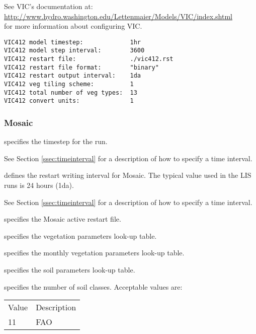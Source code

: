 
 See VIC's documentation at: \\
 \hyperref{http://www.hydro.washington.edu/Lettenmaier/Models/VIC/index.shtml}{}{}{http://www.hydro.washington.edu/Lettenmaier/Models/VIC/index.shtml} \\
 for more information about configuring VIC.
 

 \begin{Verbatim}[frame=single]
VIC412 model timestep:             1hr
VIC412 model step interval:        3600
VIC412 restart file:               ./vic412.rst
VIC412 restart file format:        "binary"
VIC412 restart output interval:    1da
VIC412 veg tiling scheme:          1
VIC412 total number of veg types:  13
VIC412 convert units:              1
 \end{Verbatim}




 
 \subsubsection{Mosaic} \label{sssec:lsm_mosaic}
 

 
  specifies the timestep for the run.

 See Section \ref{ssec:timeinterval} for a description
 of how to specify a time interval.

  defines the restart
 writing interval for Mosaic.  The typical value used in the
 LIS runs is 24 hours (1da).

 See Section \ref{ssec:timeinterval} for a description
 of how to specify a time interval.

  specifies the Mosaic active restart file.

  specifies the vegetation
 parameters look-up table.

  specifies the
 monthly vegetation parameters look-up table.

  specifies the soil
 parameters look-up table.

  specifies the number of soil
 classes.
 Acceptable values are:

 \begin{tabular}{ll}
 Value & Description \\
  11   & FAO         \\
 \end{tabular}

